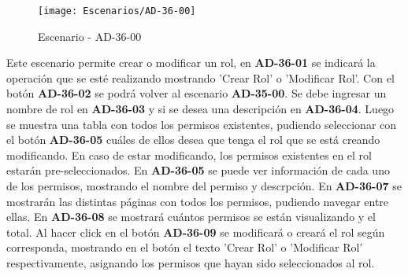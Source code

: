 \begin{figure}[H]
\centering
\texttt{[image: Escenarios/AD-36-00]}
\caption{Escenario - AD-36-00}
\label{fig:AD-36-00}
\end{figure}

Este escenario permite crear o modificar un rol, en \textbf{AD-36-01} se indicará la operación que se esté realizando mostrando 'Crear Rol' o 'Modificar Rol'. Con el botón \textbf{AD-36-02} se podrá volver al escenario \textbf{AD-35-00}. Se debe ingresar un nombre de rol en \textbf{AD-36-03} y si se desea una descripción en \textbf{AD-36-04}. Luego se muestra una tabla con todos los permisos existentes, pudiendo seleccionar con el botón \textbf{AD-36-05} cuáles de ellos desea que tenga el rol que se está creando modificando. En caso de estar modificando, los permisos existentes en el rol estarán pre-seleccionados. En \textbf{AD-36-05} se puede ver información de cada uno de los permisos, mostrando el nombre del permiso y descrpción. En \textbf{AD-36-07} se mostrarán las distintas páginas con todos los permisos, pudiendo navegar entre ellas. En \textbf{AD-36-08} se mostrará cuántos permisos se están visualizando y el total.
Al hacer click en el botón \textbf{AD-36-09} se modificará o creará el rol según corresponda, mostrando en el botón el texto 'Crear Rol' o 'Modificar Rol' respectivamente, asignando los permisos que hayan sido seleccionados al rol.
\clearpage
